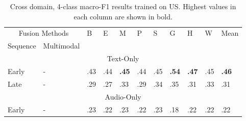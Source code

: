 \documentclass{article}
\begin{document}
\begin{table}[H]
\centering
\caption{Cross domain, 4-class macro-F1 results trained on US. Highest values in each column are shown in bold.}
\begin{tabular}{|lllllllllll|}
\hline
\multicolumn{2}{|c|}{Fusion   Methods}                                            & \multirow{2}{*}{B} & \multirow{2}{*}{E} & \multirow{2}{*}{M} & \multirow{2}{*}{P} & \multirow{2}{*}{S} & \multirow{2}{*}{G} & \multirow{2}{*}{H} & \multicolumn{1}{l|}{\multirow{2}{*}{W}} & \multirow{2}{*}{Mean} \\ \cline{1-2}
\multicolumn{1}{|l|}{Sequence}               & \multicolumn{1}{l|}{Multimodal}    &                    &                    &                    &                    &                    &                    &                    & \multicolumn{1}{l|}{}                   &                       \\ \hline
\multicolumn{11}{|c|}{Text-Only}                                                                                                                                                                                                                                                                       \\ \hline
\multicolumn{1}{|l|}{Early}                  & \multicolumn{1}{l|}{-}             & .43                & .44                & \textbf{.45}       & .44                & .45                & \textbf{.54}       & \textbf{.47}       & \multicolumn{1}{l|}{.45}                & \textbf{.46}          \\
\multicolumn{1}{|l|}{Late}                   & \multicolumn{1}{l|}{-}             & .29                & .27                & .33                & .29                & .34                & .35                & .31                & \multicolumn{1}{l|}{.33}                & .31                   \\ \hline
\multicolumn{11}{|c|}{Audio-Only}                                                                                                                                                                                                                                                                      \\ \hline
\multicolumn{1}{|l|}{Early}                  & \multicolumn{1}{l|}{-}             & .23                & .22                & .23                & .22                & .23                & .18                & .22                & \multicolumn{1}{l|}{.22}                & .22                   \\

\end{tabular}
\end{table}
\end{document}
